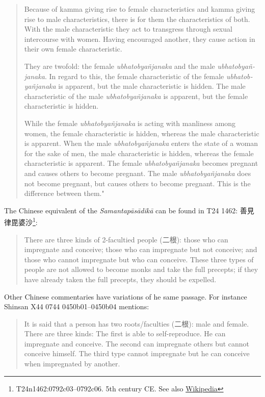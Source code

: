 \begin{quote}
Because of kamma giving rise to female characteristics and kamma giving rise to male characteristics, there is for them the characteristics of both. With the male characteristic they act to transgress through sexual intercourse with women. Having encouraged another, they cause action in their own female characteristic. 

They are twofold: the female {\em ubhatob­yañ­janaka} and the male {\em ubhatob­yañ­janaka}. In regard to this, the female characteristic of the female {\em ubhatob­yañ­janaka} is apparent, but the male characteristic is hidden. The male characteristic of the male {\em ubhatob­yañ­janaka} is apparent, but the female characteristic is hidden. 

While the female {\em ubhatob­yañ­janaka} is acting with manliness among women, the female characteristic is hidden, whereas the male characteristic is apparent. 
When the male {\em ubhatob­yañ­janaka} enters the state of a woman for the sake of men, the male characteristic is hidden, whereas the female characteristic is apparent. 
The female {\em ubhatob­yañ­janaka} becomes pregnant and causes others to become pregnant. The male {\em ubhatob­yañ­janaka} does not become pregnant, but causes others to become pregnant. This is the difference between them."
\end{quote}

The Chinese equivalent of the {\em Samantapāsādikā} can be found in T24 1462: 善見律毘婆沙\footnote{T24n1462:0792c03–0792c06. 5th century CE. See also \href{https://zh.wikipedia.org/zh-hk/%E5%96%84%E8%A6%8B%E5%BE%8B%E6%AF%98%E5%A9%86%E6%B2%99}{Wikipedia}}:
\begin{quote}
There are three kinds of 2-facultied people (二根): those who can impregnate and conceive; those who can impregnate but not conceive; and those who cannot impregnate but who can conceive. These three types of people are not allowed to become monks and take the full precepts; if they have already taken the full precepts, they should be expelled.
\end{quote}

Other Chinese commentaries have variations of he same passage. For instance Shinsan X44 0744 0450b01–0450b04 mentions:
\begin{quote}
It is said that a person has two roots/faculties (二根): male and female. There are three kinds: The first is able to self-reproduce. He can impregnate and conceive. The second can impregnate others but cannot conceive himself. The third type cannot impregnate but he can conceive when impregnated by another. 
\end{quote}

